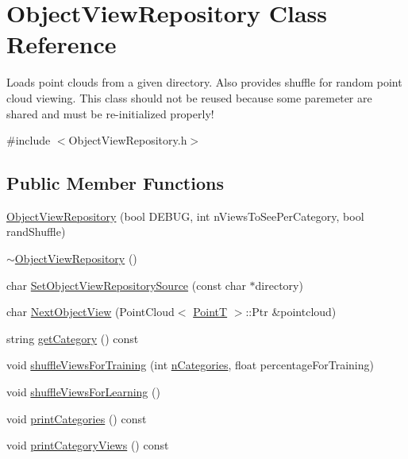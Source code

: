 \hypertarget{class_object_view_repository}{}\section{Object\+View\+Repository Class Reference}
\label{class_object_view_repository}


Loads point clouds from a given directory. Also provides shuffle for random point cloud viewing. This class should not be reused because some paremeter are shared and must be re-\/initialized properly!  




{\ttfamily \#include $<$Object\+View\+Repository.\+h$>$}

\subsection*{Public Member Functions}
\begin{DoxyCompactItemize}
\item 
\hyperlink{class_object_view_repository_a1197d0cb7fe1bd05ff2da5a8cf215cc5}{Object\+View\+Repository} (bool D\+E\+B\+UG, int n\+Views\+To\+See\+Per\+Category, bool rand\+Shuffle)
\item 
\hyperlink{class_object_view_repository_a168d69e2f40f5f97bd8b56f3eca35cde}{$\sim$\+Object\+View\+Repository} ()
\item 
char \hyperlink{class_object_view_repository_adceeb33508a5e48f32c304d84a84313b}{Set\+Object\+View\+Repository\+Source} (const char $\ast$directory)
\item 
char \hyperlink{class_object_view_repository_adc9db1af3b3d61f0fe45a6a4173abd0d}{Next\+Object\+View} (Point\+Cloud$<$ \hyperlink{include_8h_a6ca7710b84e9152e036423253ffc1ae7}{PointT} $>$\+::Ptr \&pointcloud)
\item 
string \hyperlink{class_object_view_repository_a36db267a37e49a138719124066411bc1}{get\+Category} () const
\item 
void \hyperlink{class_object_view_repository_af99676826f94e205b37b9b76d07d32ab}{shuffle\+Views\+For\+Training} (int \hyperlink{pcd__read_8cpp_a21d538faa7b6b1c86f9d819afb80545a}{n\+Categories}, float percentage\+For\+Training)
\item 
void \hyperlink{class_object_view_repository_ab82bb5b777885bc5900ca9ba55eabbd6}{shuffle\+Views\+For\+Learning} ()
\item 
void \hyperlink{class_object_view_repository_afb69d2aac573032b3c10a57060d2eab7}{print\+Categories} () const
\item 
void \hyperlink{class_object_view_repository_a5fe3f74c032f0d24f695eaee1714071c}{print\+Category\+Views} () const
\end{DoxyCompactItemize}


